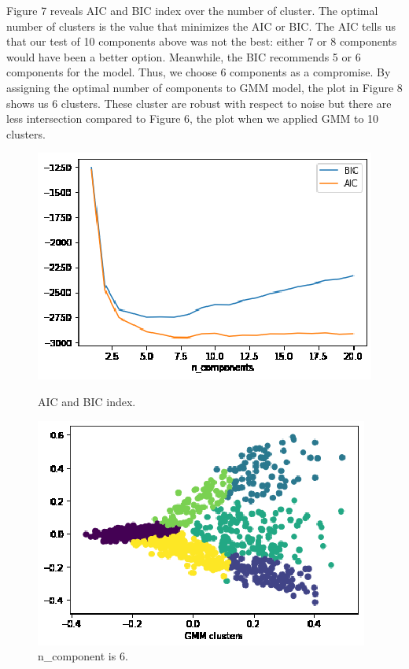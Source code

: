 \documentclass[12pt]{article}
\begin{document}
Figure 7 reveals AIC and BIC index over the number of cluster. The optimal number of clusters is the value that minimizes the AIC or BIC. The AIC tells us that our test of 10 components above was not the best: either 7 or 8 components would have been a better option. Meanwhile, the BIC recommends 5 or 6 components for the model. Thus, we choose 6 components as a compromise. By assigning the optimal number of components to GMM model, the plot in Figure 8 shows us 6 clusters. These cluster are robust with respect to noise but there are less intersection compared to Figure 6, the plot when we applied GMM to 10 clusters.

\begin{figure}[!b]
  \centering
  \begin{minipage}[b]{0.45\textwidth}
    \includegraphics[width=1\columnwidth]{9_gmm_bic.eps}
    \caption{AIC and BIC index.}
  \end{minipage}
  \hfill
  \begin{minipage}[b]{0.45\textwidth}
    \includegraphics[width=1\columnwidth]{9_mm_scatterplot.eps}
    \caption{n\_component is 6.\label{nqa}}
  \end{minipage}
\end{figure}
\end{document}
